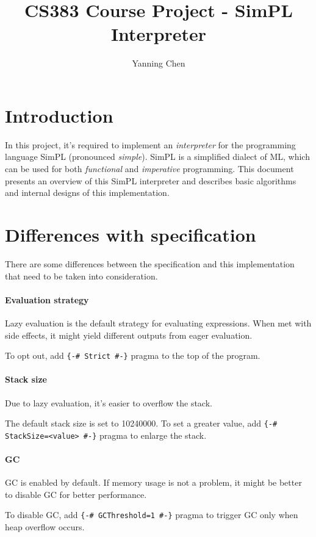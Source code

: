 \documentclass[a4paper]{article}
\title{CS383 Course Project - SimPL Interpreter}
\author{Yanning Chen\quad519021910103}
\begin{document}
\maketitle
\tableofcontents

\section{Introduction}
In this project, it's required to implement an \textit{interpreter} for the programming language SimPL (pronounced \textit{simple}). SimPL is a simplified dialect of ML, which can be used for both \textit{functional} and \textit{imperative} programming. This document presents an overview of this SimPL interpreter and describes basic algorithms and internal designs of this implementation.

\section{Differences with specification}

There are some differences between the specification and this implementation that need to be taken into consideration.

\paragraph{Evaluation strategy} Lazy evaluation is the default strategy for evaluating expressions. When met with side effects, it might yield different outputs from eager evaluation.

To opt out, add \texttt{\{-\# Strict \#-\}} pragma to the top of the program.

\paragraph{Stack size} Due to lazy evaluation, it's easier to overflow the stack.

The default stack size is set to 10240000.
To set a greater value, add \texttt{\{-\# StackSize=<value> \#-\}} pragma to enlarge the stack.

\paragraph{GC} GC is enabled by default. If memory usage is not a problem, it might be better to disable GC for better performance.

To disable GC, add \texttt{\{-\# GCThreshold=1 \#-\}} pragma to trigger GC only when heap overflow occurs.
\end{document}

